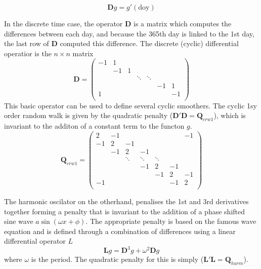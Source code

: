 \begin{equation}
  \bm{D}g = g'(\text{doy})
\end{equation}

In the discrete time case, the operator $\bm{D}$ is a matrix which computes the differences between each day, and because the 365th day is linked to the 1st day, the last row of $\bm{D}$ computed this difference. The discrete (cyclic) differential operatior is the $n \times n$ matrix
\begin{equation}
\bm{D} = 
\begin{pmatrix} 
-1 & 1 &  &  &  &  &  \\ 
 & -1 & 1 &  &  &  &  \\ 
 &  &  & \ddots & \ddots &  &  \\ 
 &  &  &  &  & -1 & 1 \\ 
1 &  &  &  &  &  & -1 \\ 
\end{pmatrix}
\end{equation}
This basic operator can be used to define several cyclic smoothers.  The cyclic 1sy order random walk is given by the quadratic penalty ($\bm{D}'\bm{D}=\bm{Q}_{crw1}$), which is invariant to the additon of a constant term to the functon $g$. 
\begin{equation}
\bm{Q}_{crw1} = 
\begin{pmatrix} 
2 & -1 &  &  &  &  & -1 \\ 
-1 & 2 & -1 &  &  &  &  \\ 
 & -1 & 2 & -1 &  &  &  \\ 
 &  & \ddots & \ddots & \ddots &  &  \\ 
 &  &  & -1 & 2 & -1 &  \\ 
 &  &  &  & -1 & 2 & -1 \\ 
-1 &  &  &  &  & -1 & 2 \\ 
\end{pmatrix}
\end{equation}

The harmonic oscilator on the otherhand, penalises the 1st and 3rd derivatives together forming a penalty that is invariant to the addition of a phase shifted sine wave $a \sin(\omega x + \phi)$.  The appropriate penalty is based on the famous wave equation and is defined through a combination of differences using a linear differential operator $L$
\begin{equation}
  \bm{L}g = \bm{D}^{3}g + \omega^2\bm{D}g
\end{equation}
where $\omega$ is the period. The quadratic penalty for this is simply ($\bm{L}'\bm{L}=\bm{Q}_{harm}$).


